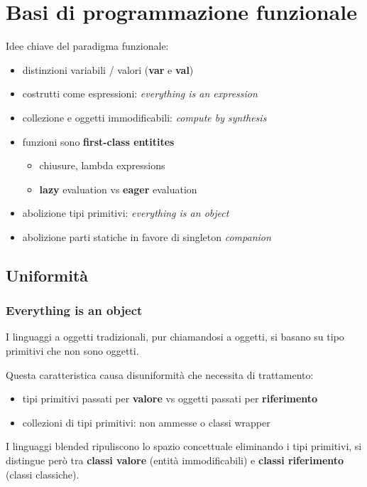 \chapter{Basi di programmazione funzionale}

Idee chiave del paradigma funzionale:
\begin{itemize}
    \item distinzioni variabili / valori (\textbf{var} e \textbf{val})
    \item costrutti come espressioni: \textit{everything is an expression}
    \item collezione e oggetti immodificabili: \textit{compute by synthesis}
    \item funzioni sono \textbf{first-class entitites}
    \begin{itemize}
        \item chiusure, lambda expressions
        \item \textbf{lazy} evaluation vs \textbf{eager} evaluation
    \end{itemize}
    \item abolizione tipi primitivi: \textit{everything is an object}
    \item abolizione parti statiche in favore di singleton \textit{companion}
\end{itemize}

\section{Uniformità}

\subsection{Everything is an object}
I linguaggi a oggetti tradizionali, pur chiamandosi a oggetti, si basano su tipo primitivi che non sono oggetti.

Questa caratteristica causa disuniformità che necessita di trattamento:
\begin{itemize}
    \item tipi primitivi passati per \textbf{valore} vs oggetti passati per \textbf{riferimento}
    \item collezioni di tipi primitivi: non ammesse o classi wrapper
\end{itemize}

I linguaggi blended ripuliscono lo spazio concettuale eliminando i tipi primitivi, si distingue però tra \textbf{classi valore} (entità immodificabili) e \textbf{classi riferimento} (classi classiche).


